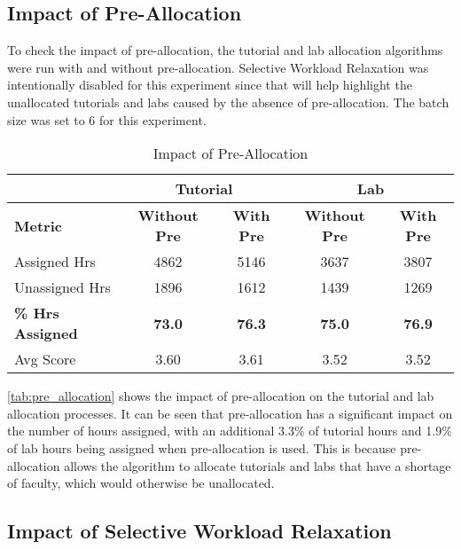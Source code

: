 \subsection{Impact of Pre-Allocation}

To check the impact of pre-allocation, the tutorial and lab allocation algorithms were run with and without pre-allocation. Selective Workload Relaxation was intentionally disabled for this experiment since that will help highlight the unallocated tutorials and labs caused by the absence of pre-allocation. The batch size was set to 6 for this experiment.

\begin{table}[H]
  \centering
  \begin{tabular}{|l|c|c|c|c|}
    \hline
                             & \multicolumn{2}{c|}{Tutorial} & \multicolumn{2}{c|}{Lab}                                            \\ \hline
    \textbf{Metric}          & \textbf{Without Pre}          & \textbf{With Pre}        & \textbf{Without Pre} & \textbf{With Pre} \\ \hline
    Assigned Hrs             & 4862                          & 5146                     & 3637                 & 3807              \\ \hline
    Unassigned Hrs           & 1896                          & 1612                     & 1439                 & 1269              \\ \hline
    \textbf{\% Hrs Assigned} & \textbf{73.0}                 & \textbf{76.3}            & \textbf{75.0}        & \textbf{76.9}     \\ \hline
    Avg Score                & 3.60                          & 3.61                     & 3.52                 & 3.52              \\ \hline
  \end{tabular}
  \caption{Impact of Pre-Allocation}
  \label{tab:pre_allocation}
\end{table}

\autoref{tab:pre_allocation} shows the impact of pre-allocation on the tutorial and lab allocation processes. It can be seen that pre-allocation has a significant impact on the number of hours assigned, with an additional 3.3\% of tutorial hours and 1.9\% of lab hours being assigned when pre-allocation is used. This is because pre-allocation allows the algorithm to allocate tutorials and labs that have a shortage of faculty, which would otherwise be unallocated.

\subsection{Impact of Selective Workload Relaxation}


